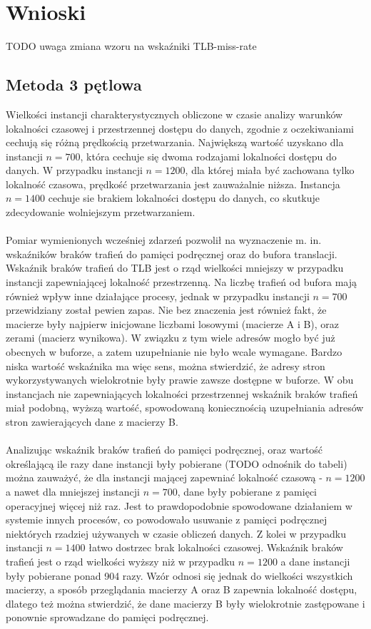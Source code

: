 \documentclass[12pt,a4paper]{article}
\begin{document}
\section{Wnioski}
{\huge TODO uwaga zmiana wzoru na wskaźniki TLB-miss-rate}\\

\subsection{Metoda 3 pętlowa}

Wielkości instancji charakterystycznych obliczone w czasie analizy warunków lokalności czasowej i przestrzennej dostępu do danych, zgodnie z oczekiwaniami cechują się różną prędkością przetwarzania. Największą wartość uzyskano dla instancji $n=700$, która cechuje się dwoma rodzajami lokalności  dostępu do danych. W przypadku instancji $n=1200$, dla której miała być zachowana tylko lokalność czasowa, prędkość przetwarzania jest zauważalnie niższa. Instancja $n=1400$ cechuje sie brakiem lokalności dostępu do danych, co skutkuje zdecydowanie wolniejszym przetwarzaniem.\\
\\
Pomiar wymienionych wcześniej zdarzeń pozwolił na wyznaczenie m. in. wskaźników braków trafień do pamięci podręcznej oraz do bufora translacji. Wskaźnik braków trafień do TLB jest o rząd wielkości mniejszy w przypadku instancji zapewniającej lokalność przestrzenną. Na liczbę trafień od bufora mają również wpływ inne działające procesy, jednak w przypadku instancji $n=700$ przewidziany został pewien zapas. Nie bez znaczenia jest również fakt, że macierze były najpierw inicjowane liczbami losowymi (macierze A i B), oraz zerami (macierz wynikowa). W związku z tym wiele adresów mogło być już obecnych w buforze, a zatem uzupełnianie nie było wcale wymagane. Bardzo niska wartość wskaźnika ma więc sens, można stwierdzić, że adresy stron wykorzystywanych wielokrotnie były prawie zawsze dostępne w buforze. W obu instancjach nie zapewniających lokalności przestrzennej wskaźnik braków trafień miał podobną, wyższą wartość, spowodowaną koniecznością uzupełniania adresów stron zawierających dane z macierzy B.\\
\\
Analizując wskaźnik braków trafień do pamięci podręcznej, oraz wartość określającą ile razy dane instancji były pobierane (TODO odnośnik do tabeli) można zauważyć, że dla instancji mającej zapewniać lokalność czasową - $n=1200$ a nawet dla mniejszej instancji $n=700$, dane były pobierane z pamięci operacyjnej więcej niż raz. Jest to prawdopodobnie spowodowane działaniem w systemie innych procesów, co powodowało usuwanie z pamięci podręcznej niektórych rzadziej używanych w czasie obliczeń danych. Z kolei w przypadku instancji $n=1400$ łatwo dostrzec brak lokalności czasowej. Wskaźnik braków trafień jest o rząd wielkości wyższy niż w przypadku $n=1200$ a dane instancji były pobierane ponad 904 razy. Wzór odnosi się jednak do wielkości wszystkich macierzy, a sposób przeglądania macierzy A oraz B zapewnia lokalność dostępu, dlatego też można stwierdzić, że dane macierzy B były wielokrotnie zastępowane i ponownie sprowadzane do pamięci podręcznej.\\
\end{document}

